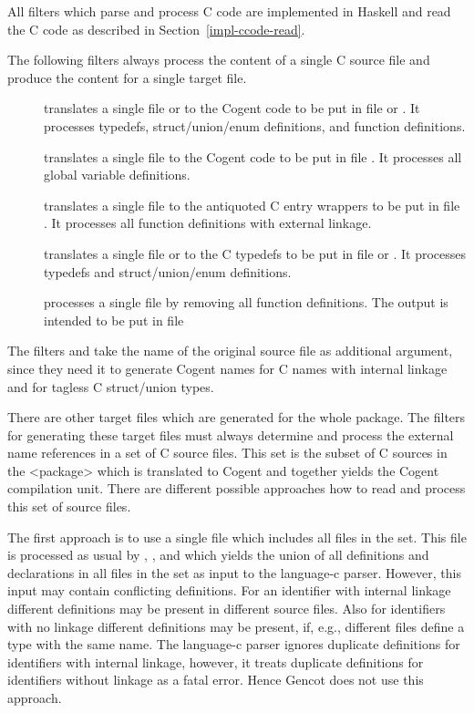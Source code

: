 All filters which parse and process C code are implemented in Haskell and read the
C code as described in Section~\ref{impl-ccode-read}.

The following filters always process the content of a single C source file and produce the content for a single 
target file.
\begin{description}
\item[] translates a single file  or  to the Cogent code to be put in file
 or . It processes typedefs, struct/union/enum definitions, and function
definitions. 
\item[] translates a single file  to the Cogent code to be put in file .
It processes all global variable definitions.
\item[] translates a single file  to the antiquoted C entry wrappers to be put in
file . It processes all function definitions with external linkage.
\item[] translates a single file  or  to the C typedefs to be put in
file  or . It processes typedefs and struct/union/enum definitions.
\item[] processes a single file  by removing all function definitions. The output
is intended to be put in file 
\end{description}

The filters  and  take the name of the original source file as additional
argument, since they need it to generate Cogent names for C names with internal linkage and for tagless C struct/union
types.

There are other target files which are generated for the whole package. The filters for generating these target files 
must always determine and process the external name references in a set of
C source files. This set is the subset of C sources in the <package> which is translated to Cogent and together yields
the Cogent compilation unit. There are different possible approaches how to read and process this set of source files.

The first approach is to use a single file which includes all files in the set. This file is processed as usual by
, , and  which yields the union of all definitions
and declarations in all files in the set as input to the language-c parser. However, this input may contain conflicting
definitions. For an identifier with internal linkage different definitions may be present in different source files.
Also for identifiers with no linkage different definitions may be present, if, e.g., different  files define
a type with the same name. The language-c parser ignores duplicate definitions for identifiers with internal linkage,
however, it treats duplicate definitions for identifiers without linkage as a fatal error. Hence Gencot does not use
this approach.

